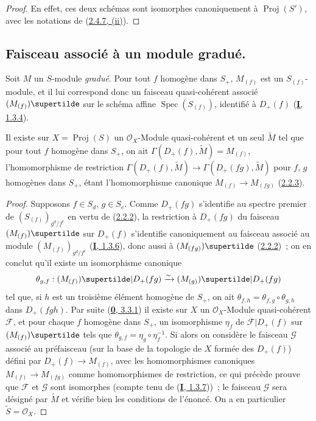 \begin{proof}
En effet, ces deux schémas sont isomorphes canoniquement à
$\operatorname{Proj}(S')$, avec les notations de
(\hyperref[II.2.4.7-fr]{2.4.7, (ii)}).
\end{proof}

\subsection{Faisceau associé à un module gradué.}
\label{subsection:II.2.5-fr}

\begin{env}[2.5.1]
\label{II.2.5.1-fr}
Soit $M$ un $S$-module \emph{gradué}. Pour tout $f$ homogène dans $S_+$,
$M_{(f)}$ est un $S_{(f)}$-module, et il lui correspond donc un faisceau
quasi-cohérent associé $(M_{(f)})\supertilde$ sur le schéma affine
$\operatorname{Spec}(S_{(f)})$, identifié à $D_+(f)$
(\hyperref[I.1.3.4-fr]{\textbf{I}, 1.3.4}).
\end{env}

\begin{proposition}[2.5.2]
\label{II.2.5.2-fr}
Il existe sur $X=\operatorname{Proj}(S)$ un $\mathcal{O}_X$-Module
quasi-cohérent et un seul $\widetilde{M}$ tel que pour tout $f$ homogène
dans $S_+$, on ait
$\Gamma(D_+(f),\widetilde{M})=M_{(f)}$, l'homomorphisme de restriction
$\Gamma(D_+(f),\widetilde{M})\to
\Gamma(D_+(fg),\widetilde{M})$ pour $f$, $g$ homogènes dans $S_+$, étant
l'homomorphisme canonique $M_{(f)}\to M_{(fg)}$
(\hyperref[II.2.2.3-fr]{2.2.3}).
\end{proposition}

\begin{proof}
Supposons $f\in S_d$, $g\in S_e$. Comme $D_+(fg)$ s'identifie au spectre
premier de $(S_{(f)})_{g^d/f^e}$ en vertu de
(\hyperref[II.2.2.2-fr]{2.2.2}), la restriction à $D_+(fg)$ du faisceau
$(M_{(f)})\supertilde$ sur $D_+(f)$ s'identifie canoniquement au faisceau
associé au module $(M_{(f)})_{g^d/f^e}$
(\hyperref[I.1.3.6-fr]{\textbf{I}, 1.3.6}), donc aussi à
$(M_{(fg)})\supertilde$ (\hyperref[II.2.2.2-fr]{2.2.2})~; on en conclut
qu'il existe un isomorphisme canonique
\[
  \theta_{g,f}:(M_{(f)})\supertilde|D_+(fg)
  \xrightarrow{\sim}(M_{(g)})\supertilde|D_+(fg)
\]
tel que, si $h$ est un troisième élément homogène de $S_+$, on ait
$\theta_{f,h}=\theta_{f,g}\circ\theta_{g,h}$ dans $D_+(fgh)$. Par suite
(\hyperref[0.3.3.1-fr]{\textbf{0}, 3.3.1}) il existe sur $X$ un
$\mathcal{O}_X$-Module quasi-cohérent $\mathcal{F}$, et pour chaque $f$
homogène dans $S_+$, un isomorphisme $\eta_f$ de
$\mathcal{F}|D_+(f)$ sur $(M_{(f)})\supertilde$ tels que
$\theta_{g,f}=\eta_g\circ\eta_f^{-1}$. Si alors on considère le faisceau
$\mathcal{G}$ associé au préfaisceau (sur la base de la topologie de $X$
formée des $D_+(f)$) défini par $D_+(f)\to M_{(f)}$, avec les
homomorphismes canoniques $M_{(f)}\to M_{(fg)}$ comme homomorphismes de
restriction, ce qui précède prouve que $\mathcal{F}$ et $\mathcal{G}$ sont
isomorphes (compte tenu de (\hyperref[I.1.3.7-fr]{\textbf{I}, 1.3.7}))~; le
faisceau $\mathcal{G}$ sera désigné par $\widetilde{M}$ et vérifie bien les
conditions de l'énoncé. On a en particulier
$\widetilde{S}=\mathcal{O}_X$.
\end{proof}

